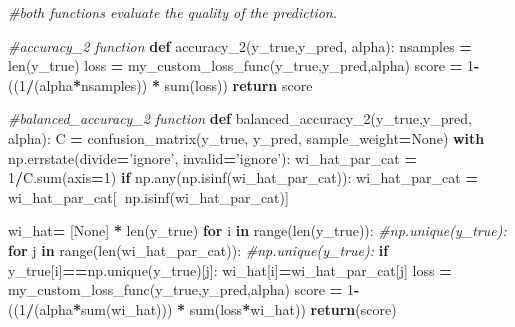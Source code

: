 \documentclass[10pt,a4paper]{article}
\newenvironment{Shaded}{\begin{snugshade}}{\end{snugshade}}
\newcommand{\BuiltInTok}[1]{#1}
\newcommand{\CommentTok}[1]{\textcolor[rgb]{0.56,0.35,0.01}{\textit{#1}}}
\newcommand{\ControlFlowTok}[1]{\textcolor[rgb]{0.13,0.29,0.53}{\textbf{#1}}}
\newcommand{\DecValTok}[1]{\textcolor[rgb]{0.00,0.00,0.81}{#1}}
\newcommand{\KeywordTok}[1]{\textcolor[rgb]{0.13,0.29,0.53}{\textbf{#1}}}
\newcommand{\NormalTok}[1]{#1}
\newcommand{\OperatorTok}[1]{\textcolor[rgb]{0.81,0.36,0.00}{\textbf{#1}}}
\newcommand{\StringTok}[1]{\textcolor[rgb]{0.31,0.60,0.02}{#1}}
\newcommand{\VariableTok}[1]{\textcolor[rgb]{0.00,0.00,0.00}{#1}}
\theoremstyle{break}
\begin{document}
\begin{Shaded}
\begin{Highlighting}[]
\CommentTok{#both functions evaluate the quality of the prediction.}

\CommentTok{#accuracy_2 function}
\KeywordTok{def}\NormalTok{ accuracy_2(y_true,y_pred, alpha):}
\NormalTok{    nsamples }\OperatorTok{=} \BuiltInTok{len}\NormalTok{(y_true)}
\NormalTok{    loss }\OperatorTok{=}\NormalTok{ my_custom_loss_func(y_true,y_pred,alpha)}
\NormalTok{    score }\OperatorTok{=} \DecValTok{1}\OperatorTok{-}\NormalTok{((}\DecValTok{1}\OperatorTok{/}\NormalTok{(alpha}\OperatorTok{*}\NormalTok{nsamples)) }\OperatorTok{*} \BuiltInTok{sum}\NormalTok{(loss))}
    \ControlFlowTok{return}\NormalTok{ score}

\CommentTok{#balanced_accuracy_2 function}
\KeywordTok{def}\NormalTok{ balanced_accuracy_2(y_true,y_pred, alpha):}
\NormalTok{    C }\OperatorTok{=}\NormalTok{ confusion_matrix(y_true, y_pred, sample_weight}\OperatorTok{=}\VariableTok{None}\NormalTok{)    }
    \ControlFlowTok{with}\NormalTok{ np.errstate(divide}\OperatorTok{=}\StringTok{'ignore'}\NormalTok{, invalid}\OperatorTok{=}\StringTok{'ignore'}\NormalTok{):}
\NormalTok{        wi_hat_par_cat }\OperatorTok{=} \DecValTok{1}\OperatorTok{/}\NormalTok{C.}\BuiltInTok{sum}\NormalTok{(axis}\OperatorTok{=}\DecValTok{1}\NormalTok{)}
    \ControlFlowTok{if}\NormalTok{ np.}\BuiltInTok{any}\NormalTok{(np.isinf(wi_hat_par_cat)):}
\NormalTok{        wi_hat_par_cat }\OperatorTok{=}\NormalTok{ wi_hat_par_cat[}\OperatorTok{~}\NormalTok{np.isinf(wi_hat_par_cat)]    }

\NormalTok{    wi_hat}\OperatorTok{=}\NormalTok{ [}\VariableTok{None}\NormalTok{] }\OperatorTok{*} \BuiltInTok{len}\NormalTok{(y_true)}
    \ControlFlowTok{for}\NormalTok{ i }\KeywordTok{in} \BuiltInTok{range}\NormalTok{(}\BuiltInTok{len}\NormalTok{(y_true)):     }\CommentTok{#np.unique(y_true):}
        \ControlFlowTok{for}\NormalTok{ j }\KeywordTok{in} \BuiltInTok{range}\NormalTok{(}\BuiltInTok{len}\NormalTok{(wi_hat_par_cat)): }\CommentTok{#np.unique(y_true): }
            \ControlFlowTok{if}\NormalTok{ y_true[i]}\OperatorTok{==}\NormalTok{np.unique(y_true)[j]: }
\NormalTok{                wi_hat[i]}\OperatorTok{=}\NormalTok{wi_hat_par_cat[j]}
\NormalTok{    loss }\OperatorTok{=}\NormalTok{ my_custom_loss_func(y_true,y_pred,alpha)}
\NormalTok{    score }\OperatorTok{=} \DecValTok{1}\OperatorTok{-}\NormalTok{((}\DecValTok{1}\OperatorTok{/}\NormalTok{(alpha}\OperatorTok{*}\BuiltInTok{sum}\NormalTok{(wi_hat))) }\OperatorTok{*} \BuiltInTok{sum}\NormalTok{(loss}\OperatorTok{*}\NormalTok{wi_hat))}
    \ControlFlowTok{return}\NormalTok{(score)}
\end{Highlighting}
\end{Shaded}
\end{document}
